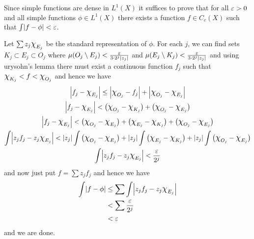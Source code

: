 \documentclass{article}
\begin{document}
\begin{homeworkProblem}
    Since simple functions are dense in $L^1(X)$ it suffices to prove that for all $\varepsilon>0$ and all simple functions $\phi\in L^1(X)$ there exists a function $f\in C_c(X)$ such that \(\int \abs{f-\phi}<\eps\). 
    
    Let $\sum z_j\Chi_{E_j}$ be the standard representation of $\phi$. For each $j$, we can find sets $K_j\subset E_j\subset O_j$ where $\mu(O_j\setminus E_j)<\frac{\eps}{3 \cdot 2^{j}\abs{z_j}}$ and $\mu(E_j\setminus K_j)<\frac{\eps}{3 \cdot 2^{j}\abs{z_j}}$ and using urysohn's lemma there must exist a continuous function $f_j$ such that $\Chi_{K_j}<f<\Chi_{O_j}$ and hence we have
    \begin{gather*}
        \abs{f_j-\Chi_{E_j}} \leq \abs{\Chi_{O_j}-f_j}+\abs{\Chi_{O_j}-\Chi_{E_j}} \\
        \abs{f_j-\Chi_{E_j}} <\big(\Chi_{O_j}-\Chi_{K_j}\big)+\big(\Chi_{O_j}-\Chi_{E_j}\big) \\
        \abs{f_j-\Chi_{E_j}} <\big(\Chi_{O_j}-\Chi_{E_j}\big)+\big(\Chi_{E_j}-\Chi_{K_j}\big)+\big(\Chi_{O_j}-\Chi_{E_j}\big) \\
        \int \abs{z_jf_j-z_j\Chi_{E_j}} < \abs{z_j}\int \big(\Chi_{O_j}-\Chi_{E_j}\big)+\abs{z_j}\int \big(\Chi_{E_j}-\Chi_{K_j}\big)+\abs{z_j}\int \big(\Chi_{O_j}-\Chi_{E_j}\big) \\
        \int \abs{z_jf_j-z_j\Chi_{E_j}} < \frac{\eps}{2^{j}}
    \end{gather*}
    and now just put $f=\sum z_jf_j$ and hence we have
    \begin{align*}
        \int \abs{f-\phi} &\leq \sum \int \abs{z_jf_j-z_j\Chi_{E_j}} \\
        &< \sum \frac{\eps}{2^{j}} \\
        &< \eps
    \end{align*}
    and we are done.

\end{homeworkProblem}
\end{document}
